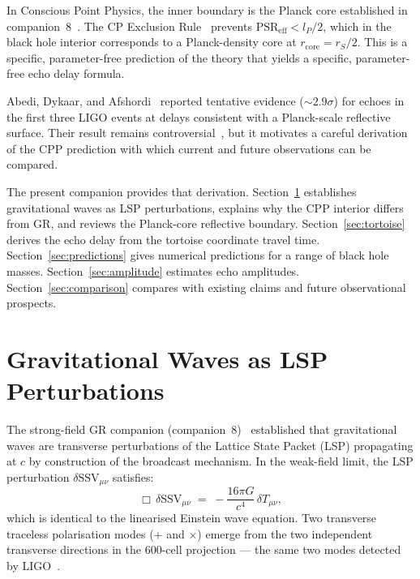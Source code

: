 \documentclass[12pt]{article}
\newcommand{\lP}{l_P}
\newcommand{\rS}{r_S}
\newcommand{\rcore}{r_{\mathrm{core}}}
\newcommand{\PSR}{\mathrm{PSR}}
\newcommand{\SSV}{\mathrm{SSV}}
\begin{document}
In Conscious Point Physics, the inner boundary is the Planck core
established in companion~8~\cite{c8}.  The CP Exclusion Rule~\cite{c1}
prevents $\PSR_{\mathrm{eff}} < \lP/2$, which in the black hole interior
corresponds to a Planck-density core at $\rcore = \rS/2$.  This is a
specific, parameter-free prediction of the theory that yields a specific,
parameter-free echo delay formula.

Abedi, Dykaar, and Afshordi~\cite{abedi2016} reported tentative evidence
($\sim\!2.9\sigma$) for echoes in the first three LIGO events at delays
consistent with a Planck-scale reflective surface.  Their result remains
controversial~\cite{westerweck2018, conti2024}, but it motivates a careful
derivation of the CPP prediction with which current and future observations
can be compared.

The present companion provides that derivation.
Section~\ref{sec:lsp_waves} establishes gravitational waves as LSP
perturbations, explains why the CPP interior differs from GR, and
reviews the Planck-core reflective boundary.
Section~\ref{sec:tortoise} derives the echo delay from the tortoise
coordinate travel time.  Section~\ref{sec:predictions} gives numerical
predictions for a range of black hole masses.  Section~\ref{sec:amplitude}
estimates echo amplitudes.  Section~\ref{sec:comparison} compares with
existing claims and future observational prospects.

\section{Gravitational Waves as LSP Perturbations}
\label{sec:lsp_waves}

The strong-field GR companion (companion~8)~\cite{c8} established that
gravitational waves are transverse perturbations of the Lattice State
Packet (LSP) propagating at $c$ by construction of the broadcast
mechanism.  In the weak-field limit, the LSP perturbation
$\delta\SSV_{\mu\nu}$ satisfies:
\begin{equation}
  \Box\,\delta\SSV_{\mu\nu}
  \;=\; -\frac{16\pi G}{c^4}\,\delta T_{\mu\nu},
  \label{eq:lsp_wave}
\end{equation}
which is identical to the linearised Einstein wave equation.  Two
transverse traceless polarisation modes ($+$ and $\times$) emerge from
the two independent transverse directions in the 600-cell projection —
the same two modes detected by LIGO~\cite{ligo2016}.
\end{document}
